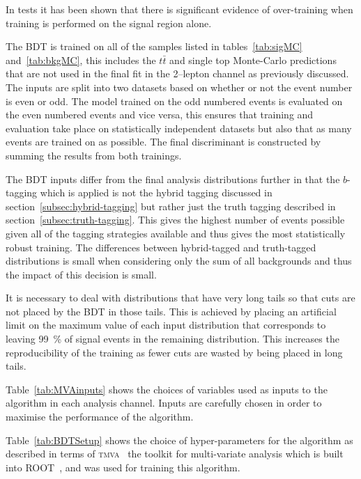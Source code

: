 
In tests it has been shown that there is significant evidence of
over-training when training is performed on the signal region alone.

The BDT is trained on all of the samples listed in tables~\ref{tab:sigMC}
and~\ref{tab:bkgMC}, this includes the $t\bar{t}$ and single top Monte-Carlo
predictions that are not used in the final fit in the 2--lepton channel as
previously discussed. The inputs are split into two datasets based on whether or
not the event number is even or odd. The model trained on the odd numbered
events is evaluated on the even numbered events and vice versa, this ensures
that training and evaluation take place on statistically independent datasets
but also that as many events are trained on as possible. The final discriminant
is constructed by summing the results from both trainings.

The BDT inputs differ from the final analysis distributions further in that the
$b$-tagging which is applied is not the hybrid tagging discussed in
section~\ref{subsec:hybrid-tagging} but rather just the truth tagging described
in section~\ref{subsec:truth-tagging}. This gives the highest number of events
possible given all of the tagging strategies available and thus gives the most
statistically robust training. The differences between hybrid-tagged and
truth-tagged distributions is small when considering only the sum of all
backgrounds and thus the impact of this decision is small.

It is necessary to deal with distributions that have very long tails so that
cuts are not placed by the BDT in those tails. This is achieved by placing an
artificial limit on the maximum value of each input distribution that
corresponds to leaving 99~\% of signal events in the remaining distribution.
This increases the reproducibility of the training as fewer cuts are wasted by
being placed in long tails.

Table~\ref{tab:MVAinputs} shows the choices of variables used as inputs to the
algorithm in each analysis channel. Inputs are carefully chosen in order to
maximise the performance of the algorithm.

Table~\ref{tab:BDTSetup} shows the choice of hyper-parameters for the algorithm
as described in terms of \textsc{tmva}~\cite{TMVA} the toolkit for multi-variate
analysis which is built into \textsc{ROOT}~\cite{ROOT}, and was used for
training this algorithm.


